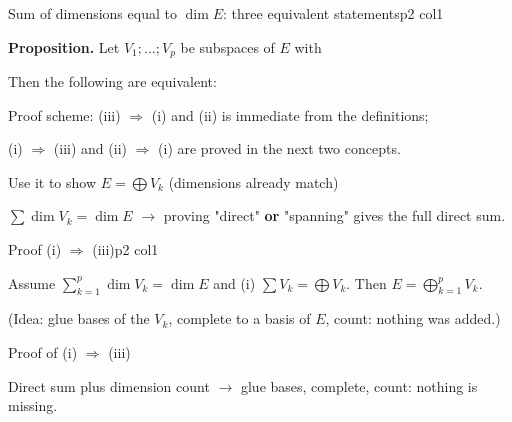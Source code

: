 \documentclass[sheet,noautoquant,noautokw]{neyvia-study}
\begin{document}
\begin{concept}[1.44]{Sum of dimensions equal to $\dim E$: three equivalent statements}{p2 col1}
\begin{definition}
\noindent \textbf{Proposition.} Let $V_1;\dots;V_p$ be subspaces of $E$ with
\par\noindent Then the following are equivalent:
\par\noindent Proof scheme: (iii) $\Rightarrow$ (i) and (ii) is immediate from the definitions;
\par\noindent (i) $\Rightarrow$ (iii) and (ii) $\Rightarrow$ (i) are proved in the next two concepts.
\end{definition}
\begin{method}{Use it to show $E=\bigoplus V_k$ (dimensions already match)}
\end{method}
\begin{reflex}
$\sum\dim V_k=\dim E$ \ensuremath{\rightarrow} proving "direct" \textbf{or} "spanning" gives the full direct sum.
\end{reflex}
\end{concept}
\begin{concept}[1.45]{Proof (i) $\Rightarrow$ (iii)}{p2 col1}
\begin{definition}
\noindent Assume $\sum_{k=1}^p\dim V_k=\dim E$ and (i) $\sum V_k=\bigoplus V_k$. Then $E=\bigoplus_{k=1}^pV_k$.
\par\noindent (Idea: glue bases of the $V_k$, complete to a basis of $E$, count: nothing was added.)
\end{definition}
\begin{method}{Proof of (i) $\Rightarrow$ (iii)}
\end{method}
\begin{reflex}
Direct sum plus dimension count \ensuremath{\rightarrow} glue bases, complete, count: nothing is missing.
\end{reflex}
\end{concept}
\end{document}
